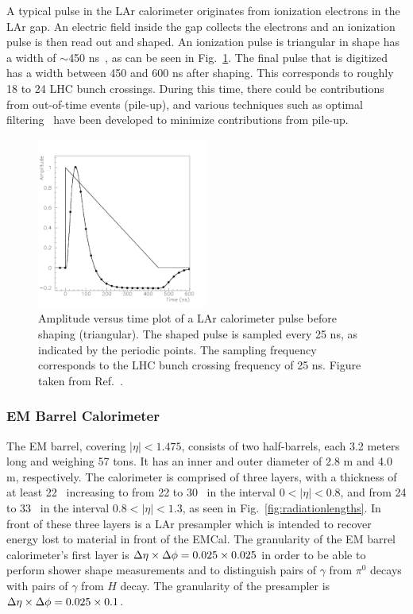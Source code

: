 A typical pulse in the LAr calorimeter originates from ionization electrons in the LAr gap. An electric field inside the gap collects the electrons and an ionization pulse is then read out and shaped. An ionization pulse is triangular in shape has a width of $\sim$450 ns~\cite{Nikiforou:2013nba}, as can be seen in Fig.~\ref{fig:larsignal}. The final pulse that is digitized has a width between 450 and 600 ns after shaping. This corresponds to roughly 18 to 24 LHC bunch crossings. During this time, there could be contributions from out-of-time events (pile-up), and various techniques such as optimal filtering~\cite{OliveiraDamazio:1630826} have been developed to minimize contributions from pile-up.

\begin{figure}[ht]
	\centerline{
		\includegraphics[width=0.5\textwidth]{figures/lar_signal.pdf} 
	}
	\caption{Amplitude versus time plot of a LAr calorimeter pulse before shaping (triangular). The shaped pulse is sampled every 25 ns, as indicated by the periodic points. The sampling frequency corresponds to the LHC bunch crossing frequency of 25 ns. Figure taken from Ref.~\cite{Aad:2008zzm}.}
	\label{fig:larsignal}
\end{figure}

\subsubsection{EM Barrel Calorimeter}
The EM barrel, covering $|\eta|<1.475$, consists of two half-barrels, each 3.2 meters long and weighing 57 tons. It has an inner and outer diameter of 2.8 m and 4.0 m, respectively. The calorimeter is comprised of three layers, with a thickness of at least 22 \radlen\, increasing to from 22 to 30 \radlen\ in the interval $0<|\eta|<0.8$, and from 24 to 33 \radlen\ in the interval $0.8<|\eta|<1.3$, as seen in Fig.~\ref{fig:radiationlengths}. In front of these three layers is a LAr presampler which is intended to recover energy lost to material in front of the EMCal. The granularity of the EM barrel calorimeter's first layer is $\mbox{$\Delta \eta$}\times\mbox{$\Delta \phi$}=0.025\times0.025$ in order to be able to perform shower shape measurements and to distinguish pairs of $\gamma$ from $\pi^{0}$ decays with pairs of $\gamma$ from $H$ decay. The granularity of the presampler is $\mbox{$\Delta \eta$}\times\mbox{$\Delta \phi$}=0.025\times0.1$. 


